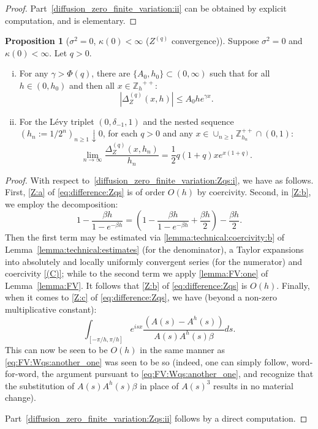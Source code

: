 \documentclass[pdftex,oneside,11pt,reqno]{amsart}
\theoremstyle{definition}
\theoremstyle{theorem}
\newtheorem{proposition}{Proposition}[section]
\theoremstyle{remark}
\numberwithin{equation}{section}
\numberwithin{definition}{section}
\begin{document}
\begin{proof}
Part~\ref{diffusion_zero_finite_variation:ii} can be obtained by explicit computation, and is elementary. 
\end{proof}

\begin{proposition}[${\sigma^2}=0$, $\kappa(0)<\infty$  (${Z^{(q)}}$ convergence)]
Suppose ${\sigma^2}=0$ and $\kappa(0)<\infty$. Let $q>0$. 

\begin{enumerate}[(i)]
\item\label{diffusion_zero_finite_variation:Zqs:i} For any $\gamma>\Phi(q)$, there are $\{A_0,h_0\}\subset (0,\infty)$ such that for all $h\in (0,h_0)$ and then all $x\in {\mathbb{Z}_h}^{++}$: $$\left\vert {\Delta_{Z}^{(q)}(x,h)}\right\vert\leq A_0he^{\gamma x}.$$
\item\label{diffusion_zero_finite_variation:Zqs:ii} For the L\'evy triplet $(0,\delta_{-1},1)$ and the nested sequence $(h_n:=1/2^n)_{n\geq 1}\downarrow 0$, for each $q> 0$ and any $x\in \cup_{n\geq 1}\mathbb{Z}_{h_n}^{++}\cap (0,1)$: $$\lim_{n\to\infty}\frac{\Delta_{Z}^{(q)}(x,h_n)}{h_n}=\frac{1}{2}q(1+q)xe^{x(1+q)}. $$
\end{enumerate}

\end{proposition}
\begin{proof} 
With respect to~\ref{diffusion_zero_finite_variation:Zqs:i}, we have as follows. First, \ref{Z:a} of \eqref{eq:difference:Zqs} is of order $O(h)$ by coercivity. Second, in \ref{Z:b}, we employ the decomposition: $$1-\frac{\beta h}{1-e^{-\beta h}}=\left(1-\frac{\beta h}{1-e^{-\beta h}}+\frac{\beta h}{2}\right)-\frac{\beta h}{2}.$$ Then the first term may be estimated via \ref{lemma:technical:coercivity:b} of Lemma~\ref{lemma:technical:estimates} (for the denominator), a Taylor expansions into absolutely and locally uniformly convergent series (for the numerator) and coercivity \ref{(C)}; while to the second term we apply \eqref{lemma:FV:one} of Lemma~\ref{lemma:FV}. It follows that \ref{Z:b} of \eqref{eq:difference:Zqs} is $O(h)$. Finally, when it comes to \ref{Z:c} of \eqref{eq:difference:Zqs}, we have (beyond a non-zero multiplicative constant): 
\begin{equation*}
\int_{[-\pi/h,\pi/h]}e^{isx}\frac{(A(s)-A^h(s))}{A(s)A^h(s)\beta}ds.
\end{equation*}
This can now be seen to be $O(h)$ in the same manner as \eqref{eq:FV:Wqs:another_one} was seen to be so (indeed, one can simply follow, word-for-word, the argument pursuant to \eqref{eq:FV:Wqs:another_one}, and recognize that the substitution of $A(s)A^h(s)\beta$ in place of $A(s)^3$ results in no material change). 

Part~\ref{diffusion_zero_finite_variation:Zqs:ii} follows by a direct computation. 
\end{proof}
\end{document}
